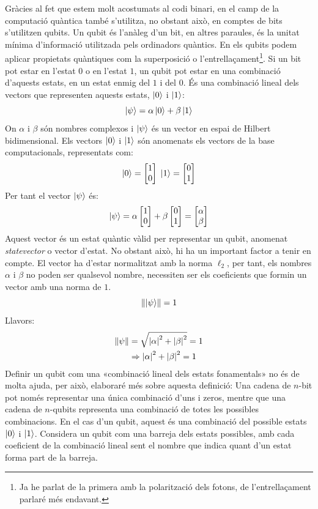 Gràcies al fet que estem molt acostumats al codi binari, en el camp de la computació quàntica també s'utilitza, no obstant això, en comptes de bits s'utilitzen qubits. Un qubit és l'anàleg d'un bit, en altres paraules, és la unitat mínima d'informació utilitzada pels ordinadors quàntics. En els qubits podem aplicar propietats quàntiques com la superposició o l'entrellaçament\footnote{Ja he parlat de la primera amb la polarització dels fotons, de l'entrellaçament parlaré més endavant.}. Si un bit pot estar en l'estat $0$ o en l'estat $1$, un qubit pot estar en una combinació d'aquests estats, en un estat enmig del $1$ i del $0$. És una combinació lineal dels vectors que representen aquests estats, $\ket{0}$ i $\ket{1}$:
$$
\ket{\psi} = \alpha\ket{0} + \beta\ket{1}
$$
On $\alpha$ i $\beta$ són nombres complexos i $\ket{\psi}$ és un vector en espai de Hilbert bidimensional. Els vectors $\ket{0}$ i $\ket{1}$ són anomenats els vectors de la base computacionals, representats com:
$$
\ket{0} = \begin{bmatrix}
	1 \\ 0
\end{bmatrix} \;
\ket{1} = \begin{bmatrix}
	0 \\ 1
\end{bmatrix}
$$
Per tant el vector $\ket{\psi}$ és:
$$
\ket{\psi} 
= \alpha 
\begin{bmatrix}
	1 \\ 0
\end{bmatrix} + \beta 
\begin{bmatrix}
	0 \\ 1
\end{bmatrix}= 
\begin{bmatrix}
	\alpha \\ \beta
\end{bmatrix}
$$
Aquest vector és un estat quàntic vàlid per representar un qubit, anomenat \textit{statevector} o vector d'estat. No obstant això, hi ha un important factor a tenir en compte. El vector ha d'estar normalitzat amb la norma $\ell_2$, per tant, els nombres $\alpha$ i $\beta$ no poden ser qualsevol nombre, necessiten ser els coeficients que formin un vector amb una norma de $1$.
$$
\norm{\ket{\psi}} = 1 
$$
Llavors:
\begin{align*}
	\norm{\psi} &= \sqrt{\abs{\alpha}^2 + \abs{\beta}^2} = 1 \\
	&\Rightarrow \abs{\alpha}^2 + \abs{\beta}^2 = 1
\end{align*}
Definir un qubit com una «combinació lineal dels estats fonamentals» no és de molta ajuda, per això, elaboraré més sobre aquesta definició:
Una cadena de $n$-bit pot només representar una única combinació d'uns i zeros, mentre que una cadena de $n$-qubits representa una combinació de totes les possibles combinacions. En el cas d'un qubit, aquest és una combinació del possible estats $\ket{0}$ i $\ket{1}$. Considera un qubit com una barreja dels estats possibles, amb cada coeficient de la combinació lineal sent el nombre que indica quant d'un estat forma part de la barreja. 

